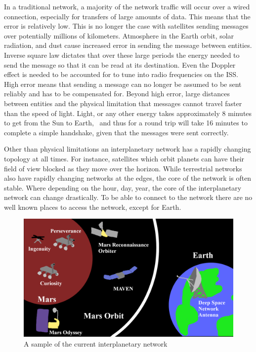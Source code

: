 \documentclass[a4paper,12pt]{article}
\begin{document}
In a traditional network, a majority of the network traffic will occur over a
wired connection, especially for transfers of large amounts of data. This means
that the error is relatively low. This is no longer the case with satellites
sending messages over potentially millions of kilometers. Atmosphere in the
Earth orbit, solar radiation, and dust cause increased error in sending the
message between entities. Inverse square law dictates that over these large
periods the energy needed to send the message so that it can be read at its
destination. Even the Doppler effect is needed to be accounted for to tune into
radio frequencies on the ISS.~\cite{qslCompensatingDoppler} High error means
that sending a message can no longer be assumed to be sent reliably and has to
be compensated for. Beyond high error, large distances between entities and the
physical limitation that messages cannot travel faster than the speed of light.
Light, or any other energy takes approximately 8 minutes to get from the Sun to
Earth,~\cite{nasa_earth} and thus for a round trip will take 16 minutes to
complete a simple handshake, given that the messages were sent correctly.

Other than physical limitations an interplanetary network has a rapidly changing
topology at all times. For instance, satellites which orbit planets can have
their field of view blocked as they move over the horizon. While terrestrial
networks also have rapidly changing networks at the edges, the core of the
network is often stable. Where depending on the hour, day, year, the core of the
interplanetary network can change drastically. To be able to connect to the
network there are no well known places to access the network, except for Earth.

\begin{figure}[h]
  \centering
  \includegraphics[width=\textwidth]{media/ipn.png}
  \caption{A sample of the current interplanetary network}
\end{figure}
\end{document}
